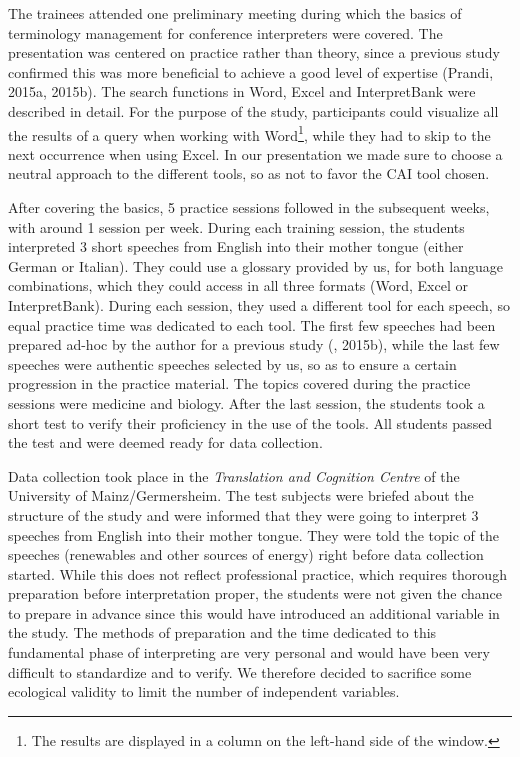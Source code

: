 \documentclass[output=paper]{langsci/langscibook}
\begin{document}
The trainees attended one preliminary meeting during which the basics of terminology management for conference interpreters were covered. The presentation was centered on practice rather than theory, since a previous study confirmed this was more beneficial to achieve a good level of expertise (Prandi, 2015a, 2015b). The search functions in Word, Excel and InterpretBank were described in detail. For the purpose of the study, participants could visualize all the results of a query when working with Word\footnote{The results are displayed in a column on the left-hand side of the window.}, while they had to skip to the next occurrence when using Excel. In our presentation we made sure to choose a neutral approach to the different tools, so as not to favor the CAI tool chosen.

After covering the basics, 5 practice sessions followed in the subsequent weeks, with around 1 session per week. During each training session, the students interpreted 3 short speeches from English into their mother tongue (either German or Italian). They could use a glossary provided by us, for both language combinations, which they could access in all three formats (Word, Excel or InterpretBank). During each session, they used a different tool for each speech, so equal practice time was dedicated to each tool. The first few speeches had been prepared ad-hoc by the author for a previous study (\citealt{Prandi2015a}, 2015b), while the last few speeches were authentic speeches selected by us, so as to ensure a certain progression in the practice material. The topics covered during the practice sessions were medicine and biology. After the last session, the students took a short test to verify their proficiency in the use of the tools. All students passed the test and were deemed ready for data collection.

Data collection took place in the \textit{Translation and Cognition Centre} of the University of Mainz/Germersheim. The test subjects were briefed about the structure of the study and were informed that they were going to interpret 3 speeches from English into their mother tongue. They were told the topic of the speeches (renewables and other sources of energy) right before data collection started. While this does not reflect professional practice, which requires thorough preparation before interpretation proper, the students were not given the chance to prepare in advance since this would have introduced an additional variable in the study. The methods of preparation and the time dedicated to this fundamental phase of interpreting are very personal and would have been very difficult to standardize and to verify. We therefore decided to sacrifice some ecological validity to limit the number of independent variables.
\end{document}
